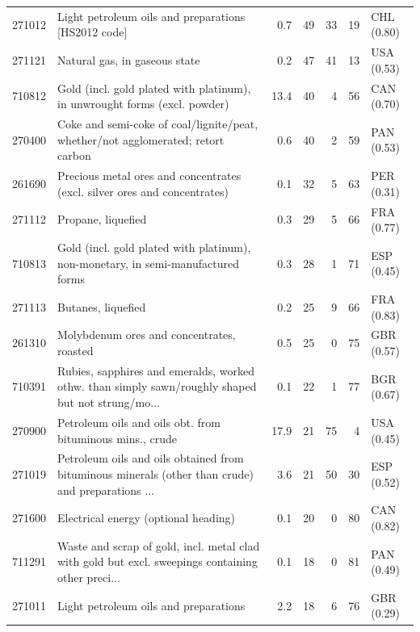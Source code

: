 \begin{tabular}{@{}l p{6.4cm} r r r r l@{}}
271012 & Light petroleum oils and preparations [HS2012 code] & 0.7 & 49 & 33 & 19 & CHL (0.80) \\
271121 & Natural gas, in gaseous state & 0.2 & 47 & 41 & 13 & USA (0.53) \\
710812 & Gold (incl. gold plated with platinum), in unwrought forms (excl. powder) & 13.4 & 40 & 4 & 56 & CAN (0.70) \\
270400 & Coke and semi-coke of coal/\allowbreak{}lignite/\allowbreak{}peat, whether/\allowbreak{}not agglomerated; retort carbon & 0.6 & 40 & 2 & 59 & PAN (0.53) \\
261690 & Precious metal ores and concentrates (excl. silver ores and concentrates) & 0.1 & 32 & 5 & 63 & PER (0.31) \\
271112 & Propane, liquefied & 0.3 & 29 & 5 & 66 & FRA (0.77) \\
710813 & Gold (incl. gold plated with platinum), non-monetary, in semi-manufactured forms & 0.3 & 28 & 1 & 71 & ESP (0.45) \\
271113 & Butanes, liquefied & 0.2 & 25 & 9 & 66 & FRA (0.83) \\
261310 & Molybdenum ores and concentrates, roasted & 0.5 & 25 & 0 & 75 & GBR (0.57) \\
710391 & Rubies, sapphires and emeralds, worked othw. than simply sawn/\allowbreak{}roughly shaped but not strung/\allowbreak{}mo... & 0.1 & 22 & 1 & 77 & BGR (0.67) \\
270900 & Petroleum oils and oils obt. from bituminous mins., crude & 17.9 & 21 & 75 & 4 & USA (0.45) \\
271019 & Petroleum oils and oils obtained from bituminous minerals (other than crude) and preparations ... & 3.6 & 21 & 50 & 30 & ESP (0.52) \\
271600 & Electrical energy (optional heading) & 0.1 & 20 & 0 & 80 & CAN (0.82) \\
711291 & Waste and scrap of gold, incl. metal clad with gold but excl. sweepings containing other preci... & 0.1 & 18 & 0 & 81 & PAN (0.49) \\
271011 & Light petroleum oils and preparations & 2.2 & 18 & 6 & 76 & GBR (0.29) \\
\bottomrule
\end{tabular}

